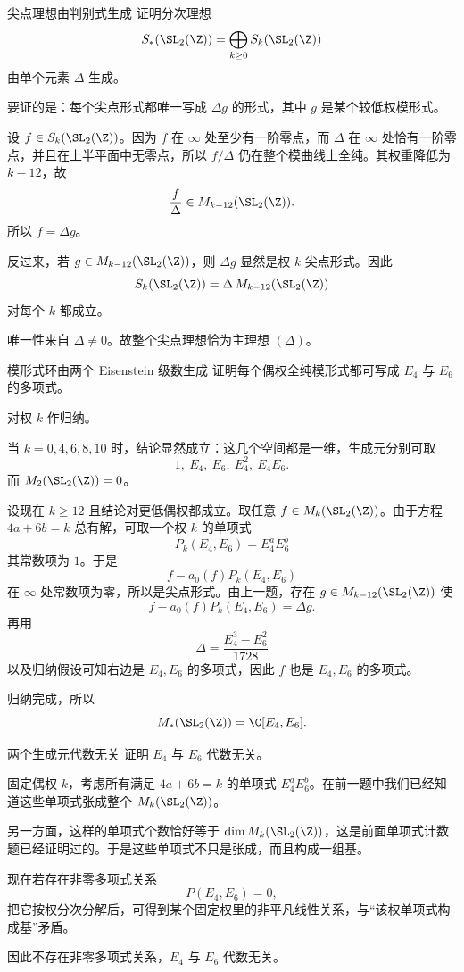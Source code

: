 \begin{problem}{尖点理想由判别式生成}
\hard
证明分次理想
\[
S_*(\SL_2(\Z))=\bigoplus_{k\ge 0} S_k(\SL_2(\Z))
\]
由单个元素 $\Delta$ 生成。
\end{problem}
\begin{solution}
要证的是：每个尖点形式都唯一写成 $\Delta g$ 的形式，其中 $g$ 是某个较低权模形式。

设 $f\in S_k(\SL_2(\Z))$。因为 $f$ 在 $\infty$ 处至少有一阶零点，而 $\Delta$ 在 $\infty$ 处恰有一阶零点，并且在上半平面中无零点，所以 $f/\Delta$ 仍在整个模曲线上全纯。其权重降低为 $k-12$，故
\[
\frac{f}{\Delta}\in M_{k-12}(\SL_2(\Z)).
\]
所以 $f=\Delta g$。

反过来，若 $g\in M_{k-12}(\SL_2(\Z))$，则 $\Delta g$ 显然是权 $k$ 尖点形式。因此
\[
S_k(\SL_2(\Z))=\Delta\,M_{k-12}(\SL_2(\Z))
\]
对每个 $k$ 都成立。

唯一性来自 $\Delta\neq 0$。故整个尖点理想恰为主理想 $(\Delta)$。
\end{solution}

\begin{problem}{模形式环由两个 Eisenstein 级数生成}
\hard
证明每个偶权全纯模形式都可写成 $E_4$ 与 $E_6$ 的多项式。
\end{problem}
\begin{solution}
对权 $k$ 作归纳。

当 $k=0,4,6,8,10$ 时，结论显然成立：这几个空间都是一维，生成元分别可取
\[
1,\ E_4,\ E_6,\ E_4^2,\ E_4E_6.
\]
而 $M_2(\SL_2(\Z))=0$。

设现在 $k\ge 12$ 且结论对更低偶权都成立。取任意 $f\in M_k(\SL_2(\Z))$。由于方程 $4a+6b=k$ 总有解，可取一个权 $k$ 的单项式
\[
P_k(E_4,E_6)=E_4^aE_6^b
\]
其常数项为 $1$。于是
\[
f-a_0(f)P_k(E_4,E_6)
\]
在 $\infty$ 处常数项为零，所以是尖点形式。由上一题，存在 $g\in M_{k-12}(\SL_2(\Z))$ 使
\[
f-a_0(f)P_k(E_4,E_6)=\Delta g.
\]
再用
\[
\Delta=\frac{E_4^3-E_6^2}{1728}
\]
以及归纳假设可知右边是 $E_4,E_6$ 的多项式，因此 $f$ 也是 $E_4,E_6$ 的多项式。

归纳完成，所以
\[
M_*(\SL_2(\Z))=\C[E_4,E_6].
\]
\end{solution}

\begin{problem}{两个生成元代数无关}
\hard
证明 $E_4$ 与 $E_6$ 代数无关。
\end{problem}
\begin{solution}
固定偶权 $k$，考虑所有满足 $4a+6b=k$ 的单项式 $E_4^aE_6^b$。在前一题中我们已经知道这些单项式张成整个 $M_k(\SL_2(\Z))$。

另一方面，这样的单项式个数恰好等于 $\dim M_k(\SL_2(\Z))$，这是前面单项式计数题已经证明过的。于是这些单项式不只是张成，而且构成一组基。

现在若存在非零多项式关系
\[
P(E_4,E_6)=0,
\]
把它按权分次分解后，可得到某个固定权里的非平凡线性关系，与“该权单项式构成基”矛盾。

因此不存在非零多项式关系，$E_4$ 与 $E_6$ 代数无关。
\end{solution}

